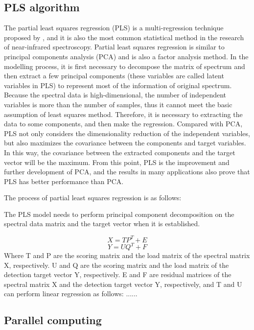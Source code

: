 \documentclass[a4paper,12pt,titlepage]{article} %
\numberwithin{equation}{section}  %
\begin{document}
	\subsection{PLS algorithm}
	\label{PLS_al}
	The partial least squares regression (PLS) is a multi-regression technique proposed by \citet{wold1984collinearity}, and it is also the most common statistical method in the research of near-infrared spectroscopy. Partial least squares regression is similar to principal components analysis (PCA) and is also a factor analysis method. In the modelling  process, it is first necessary to decompose the matrix of spectrum and then extract a few principal components (these variables are called latent variables in PLS) to represent most of the information of original spectrum. Because the spectral data is high-dimensional, the number of independent variables is more than the number of samples, thus it cannot meet the basic assumption of least squares method. Therefore, it is necessary to extracting the data to some components, and then make the regression. Compared with PCA, PLS not only considers the dimensionality reduction of the independent variables, but also maximizes the covariance between the components and target variables. In this way, the covariance between the extracted components and the target vector will be the maximum. From this point, PLS is the improvement and further development of PCA, and the results in many applications also prove that PLS has better performance than PCA.
	
	The process of partial least squares regression is as follows:
	
	The PLS model needs to perform principal component decomposition on the spectral data matrix and the target vector when it is established.
	
	\begin{equation}
	X=TP^T+E 
	\end{equation}
	\begin{equation}
	Y=UQ^T+F
	\end{equation}
	Where T and P are the scoring matrix and the load matrix of the spectral matrix X, respectively. U and Q are the scoring matrix and the load matrix of the detection target vector Y, respectively. E and F are residual matrices of the spectral matrix X and the detection target vector Y, respectively, and T and U can perform linear regression as follows:
	......
	
	\subsection{Parallel computing}
	\label{parallel}
	
\end{document}

